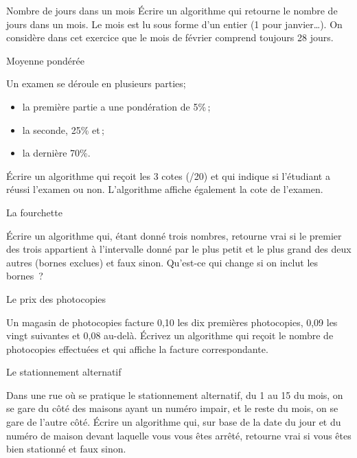 		\begin{Exercice}{Nombre de jours dans un mois}
			Écrire un algorithme qui retourne le nombre de jours dans un mois. 
			Le mois est lu sous forme d’un entier (1 pour janvier\dots).
			On considère dans cet exercice que le mois de février
			comprend toujours 28 jours.
		\end{Exercice}

		\begin{Exercice}{Moyenne pondérée}

			Un examen se déroule en plusieurs parties;
			\begin{itemize}
				\item la première partie a une pondération de 5\%\,;
				\item la seconde, 25\% et\,;
				\item la dernière 70\%.
			\end{itemize}
			Écrire un algorithme qui reçoit les 3 cotes (/20) et qui indique
			si l'étudiant a réussi l'examen ou non. L'algorithme affiche également
			la cote de l'examen. 
		\end{Exercice}	


		\begin{Exercice}{La fourchette}

			Écrire un algorithme qui, étant donné trois nombres, 
			retourne vrai si le premier des trois 
			appartient à l’intervalle donné par le plus petit et le plus grand 
			des deux autres (bornes exclues) et faux sinon. 
			Qu’est-ce qui change si on inclut les bornes~?
		\end{Exercice}

		\begin{Exercice}{Le prix des photocopies}

			Un magasin de photocopies facture 0,10 \texteuro{} 
			les dix premières photocopies, 
			0,09 \texteuro{} les vingt suivantes 
			et 0,08 \texteuro{} au-delà. 
			Écrivez un algorithme 
			qui reçoit le nombre de photocopies effectuées 
			et qui affiche la facture correspondante.
		\end{Exercice}

		\begin{Exercice}{Le stationnement alternatif}

			Dans une rue où se pratique le stationnement alternatif, du 1 au 15
			du mois, on se gare du côté des maisons ayant un numéro impair, et
			le reste du mois, on se gare de l’autre côté.  Écrire un algorithme
			qui, sur base de la date du jour et du numéro de maison devant
			laquelle vous vous êtes arrêté, retourne vrai si vous êtes bien
			stationné et faux sinon.  \end{Exercice}


